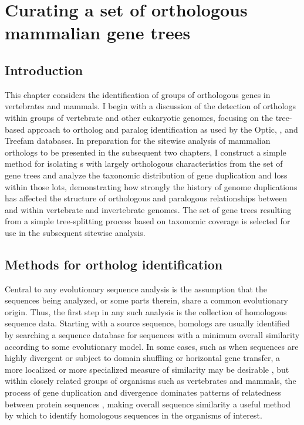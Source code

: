 \chapter{Curating a set of orthologous mammalian gene trees}
\label{ch_orthologs}
\acresetall

\section{Introduction}

This chapter considers the identification of groups of orthologous
genes in vertebrates and mammals. I begin with a discussion of the
detection of orthologs within groups of vertebrate and other
eukaryotic genomes, focusing on the tree-based approach to ortholog
and paralog identification as used by the Optic, \cmp, and Treefam
databases. In preparation for the sitewise analysis of mammalian
orthologs to be presented in the subsequent two chapters, I construct
a simple method for isolating \subtr{}s with largely orthologous
characteristics from the set of \cmp gene trees and analyze the
taxonomic distribution of gene duplication and loss within those
\acp{lot}, demonstrating how strongly the history of genome
duplications has affected the structure of orthologous and paralogous
relationships between and within vertebrate and invertebrate
genomes. The set of gene trees resulting from a simple tree-splitting
process based on taxonomic coverage is selected for use in the
subsequent sitewise analysis.

\section{Methods for ortholog identification}

Central to any evolutionary sequence analysis is the assumption that
the sequences being analyzed, or some parts therein, share a common
evolutionary origin. Thus, the first step in any such analysis is the
collection of homologous sequence data. Starting with a source
sequence, homologs are usually identified by searching a sequence
database for sequences with a minimum overall similarity according to
some evolutionary model. In some cases, such as when sequences are
highly divergent or subject to domain shuffling or horizontal gene
transfer, a more localized or more specialized measure of similarity
may be desirable \citep{Koonin2001,Sjolander2011}, but within closely
related groups of organisms such as vertebrates and mammals, the
process of gene duplication and divergence dominates patterns of
relatedness between protein sequences \citep{Ohno1970}, making overall
sequence similarity a useful method by which to identify homologous
sequences in the organisms of interest.

